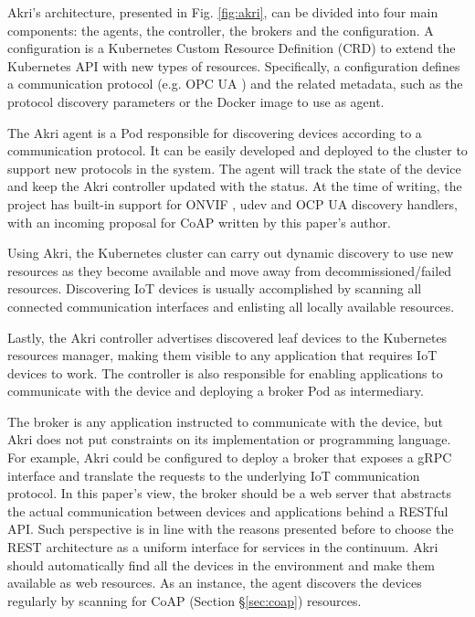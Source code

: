 Akri's architecture, presented in Fig. \ref{fig:akri}, can be divided into four main components: the agents, the controller, the brokers and the configuration. A configuration is a Kubernetes Custom Resource Definition (CRD) to extend the Kubernetes API with new types of resources. Specifically, a configuration defines a communication protocol (e.g. OPC UA \cite{gruner2016restful}) and the related metadata, such as the protocol discovery parameters or the Docker image to use as agent.

The Akri agent is a Pod responsible for discovering devices according to a communication protocol. It can be easily developed and deployed to the cluster to support new protocols in the system. The agent will track the state of the device and keep the Akri controller updated with the status. At the time of writing, the project has built-in support for ONVIF \cite{onvif}, udev \cite{udev} and OCP UA \cite{gruner2016restful} discovery handlers, with an incoming proposal for CoAP \cite{bormann2012coap} written by this paper's author.

Using Akri, the Kubernetes cluster can carry out dynamic discovery to use new resources as they become available and move away from decommissioned/failed resources. Discovering IoT devices is usually accomplished by scanning all connected communication interfaces and enlisting all locally available resources.

Lastly, the Akri controller advertises discovered leaf devices to the Kubernetes resources manager, making them visible to any application that requires IoT devices to work. The controller is also responsible for enabling applications to communicate with the device and deploying a broker Pod as intermediary. 

The broker is any application instructed to communicate with the device, but Akri does not put constraints on its implementation or programming language. For example, Akri could be configured to deploy a broker that exposes a gRPC \cite{gRPC} interface and translate the requests to the underlying IoT communication protocol. In this paper's view, the broker should be a web server that abstracts the actual communication between devices and applications behind a RESTful API. Such perspective is in line with the reasons presented before to choose the REST architecture as a uniform interface for services in the continuum. Akri should automatically find all the devices in the environment and make them available as web resources. As an instance, the agent discovers the devices regularly by scanning for CoAP (Section §\ref{sec:coap}) resources.

